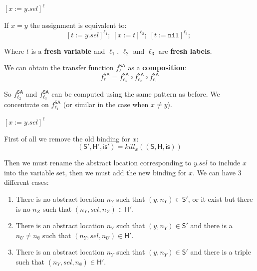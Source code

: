\documentclass[xcolor=svgnames,11pt]{beamer}
\begin{document}
\begin{frame}{$[x:=y.sel]^\ell$}

If $x = y$ the assignment is equivalent to:
$$[t:=y.sel]^{\ell_1};\; [x:=t]^{\ell_2};\; [t:=\mathtt{nil}]^{\ell_3};\; $$

Where $t$ is a \textbf{fresh variable} and $\ell_1$, $\ell_2$ and $\ell_3$ are \textbf{fresh labels}.\\

\medskip
\pause

We can obtain the transfer function $f_\ell^{\textsf{SA}}$ as a \textbf{composition}:
$$f_\ell^{\textsf{SA}} = f_{\ell_3}^{\textsf{SA}} \circ f_{\ell_2}^{\textsf{SA}} \circ f_{\ell_1}^{\textsf{SA}}$$

So $f_{\ell_2}^{\textsf{SA}}$ and $f_{\ell_3}^{\textsf{SA}}$ can be computed using the same pattern as before. We concentrate on $f_{\ell_1}^{\textsf{SA}}$ (or similar in the case when $x \neq y$).

\end{frame}

\begin{frame}{$[x:=y.sel]^\ell$}

First of all we remove the old binding for $x$:
$$ \mathsf{(S', H', is')} = kill_x (\mathsf{(S,H,is)})$$

\pause

Then we must rename the abstract location corresponding to $y.sel$ to include $x$ into the variable set, then we must add the new binding for $x$. We can have 3 different cases:

\pause

\begin{enumerate}
\item There is no abstract location $n_Y$ such that $(y, n_Y) \in \mathsf{S'}$, or  it exist but there is no $n_Z$ such that $(n_Y, sel, n_Z) \in \mathsf{H'}$. 
\pause
\item There is an abstract location $n_Y$ such that $(y, n_Y) \in \mathsf{S'}$ and there is a $n_U \neq n_\emptyset$ such that $(n_Y, sel, n_U) \in \mathsf{H'}$. 
\pause
\item There is an abstract location $n_Y$ such that $(y, n_Y) \in \mathsf{S'}$ and there is a triple such that $(n_Y, sel, n_\emptyset) \in \mathsf{H'}$. 
\end{enumerate}
\end{frame}
\end{document}
